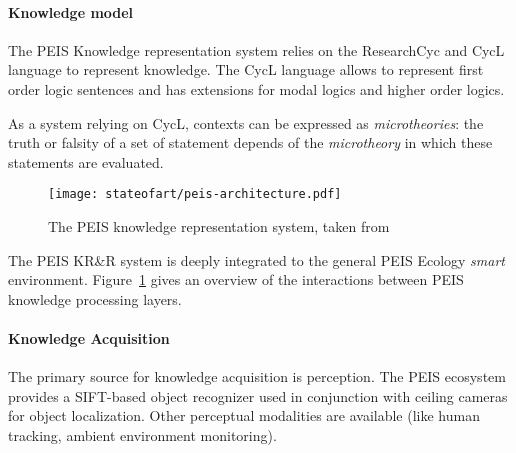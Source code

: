 
\paragraph{Knowledge model} The PEIS Knowledge representation system relies on
the {\sc ResearchCyc} and {\sc CycL} language to represent knowledge. The {\sc CycL} language
allows to represent first order logic sentences and has extensions for modal logics and higher order logics.


As a system relying on {\sc CycL}, contexts can be expressed as
\emph{microtheories}: the truth or falsity of a set of statement depends of the
\emph{microtheory} in which these statements are evaluated.


\begin{figure}
	\centering
	\texttt{[image: stateofart/peis-architecture.pdf]}
	\caption{The PEIS knowledge representation system, taken from~\cite{Daoutis2009}}
	\label{fig|peis-archi}
\end{figure}

The PEIS KR\&R system is deeply integrated to the general PEIS Ecology
\emph{smart} environment. Figure~\ref{fig|peis-archi} gives an overview of the
interactions between PEIS knowledge processing layers.

\paragraph{Knowledge Acquisition} The primary source for knowledge acquisition
is perception.  The PEIS ecosystem provides a SIFT-based object recognizer used
in conjunction with ceiling cameras for object localization.  Other perceptual
modalities are available (like human tracking, ambient environment monitoring).

